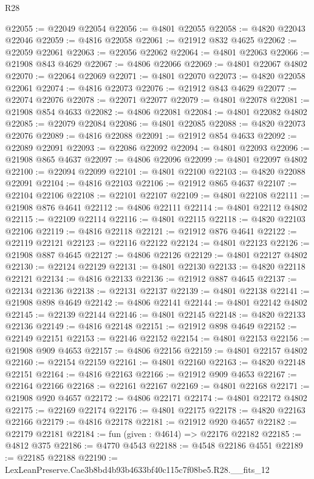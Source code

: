 \begin{lexlean}{R28}
\begin{coremodule}
@22055 := @22049 @22054
@22056 := @4801 @22055
@22058 := @4820 @22043 @22046
@22059 := @4816 @22058
@22061 := @21912 @832 @4625
@22062 := @22059 @22061
@22063 := @22056 @22062
@22064 := @4801 @22063
@22066 := @21908 @843 @4629
@22067 := @4806 @22066
@22069 := @4801 @22067 @4802
@22070 := @22064 @22069
@22071 := @4801 @22070
@22073 := @4820 @22058 @22061
@22074 := @4816 @22073
@22076 := @21912 @843 @4629
@22077 := @22074 @22076
@22078 := @22071 @22077
@22079 := @4801 @22078
@22081 := @21908 @854 @4633
@22082 := @4806 @22081
@22084 := @4801 @22082 @4802
@22085 := @22079 @22084
@22086 := @4801 @22085
@22088 := @4820 @22073 @22076
@22089 := @4816 @22088
@22091 := @21912 @854 @4633
@22092 := @22089 @22091
@22093 := @22086 @22092
@22094 := @4801 @22093
@22096 := @21908 @865 @4637
@22097 := @4806 @22096
@22099 := @4801 @22097 @4802
@22100 := @22094 @22099
@22101 := @4801 @22100
@22103 := @4820 @22088 @22091
@22104 := @4816 @22103
@22106 := @21912 @865 @4637
@22107 := @22104 @22106
@22108 := @22101 @22107
@22109 := @4801 @22108
@22111 := @21908 @876 @4641
@22112 := @4806 @22111
@22114 := @4801 @22112 @4802
@22115 := @22109 @22114
@22116 := @4801 @22115
@22118 := @4820 @22103 @22106
@22119 := @4816 @22118
@22121 := @21912 @876 @4641
@22122 := @22119 @22121
@22123 := @22116 @22122
@22124 := @4801 @22123
@22126 := @21908 @887 @4645
@22127 := @4806 @22126
@22129 := @4801 @22127 @4802
@22130 := @22124 @22129
@22131 := @4801 @22130
@22133 := @4820 @22118 @22121
@22134 := @4816 @22133
@22136 := @21912 @887 @4645
@22137 := @22134 @22136
@22138 := @22131 @22137
@22139 := @4801 @22138
@22141 := @21908 @898 @4649
@22142 := @4806 @22141
@22144 := @4801 @22142 @4802
@22145 := @22139 @22144
@22146 := @4801 @22145
@22148 := @4820 @22133 @22136
@22149 := @4816 @22148
@22151 := @21912 @898 @4649
@22152 := @22149 @22151
@22153 := @22146 @22152
@22154 := @4801 @22153
@22156 := @21908 @909 @4653
@22157 := @4806 @22156
@22159 := @4801 @22157 @4802
@22160 := @22154 @22159
@22161 := @4801 @22160
@22163 := @4820 @22148 @22151
@22164 := @4816 @22163
@22166 := @21912 @909 @4653
@22167 := @22164 @22166
@22168 := @22161 @22167
@22169 := @4801 @22168
@22171 := @21908 @920 @4657
@22172 := @4806 @22171
@22174 := @4801 @22172 @4802
@22175 := @22169 @22174
@22176 := @4801 @22175
@22178 := @4820 @22163 @22166
@22179 := @4816 @22178
@22181 := @21912 @920 @4657
@22182 := @22179 @22181
@22184 := fun (given : @4614) => @22176 @22182
@22185 := @4812 @375
@22186 := @4770 @4543
@22188 := @4548 @22186 @4551
@22189 := @22185 @22188
@22190 := LexLeanPreserve.Cae3b8bd4b93b4633bf40c115c7f08be5.R28.__fits_12

\end{coremodule}
\end{lexlean}
